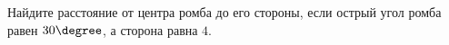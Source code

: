 \begin{ex}
	\begin{condition}
		Найдите расстояние от центра ромба до его стороны,	если острый угол ромба равен \( 30\degree \), а сторона равна \( 4 \).
	\end{condition}
\end{ex}